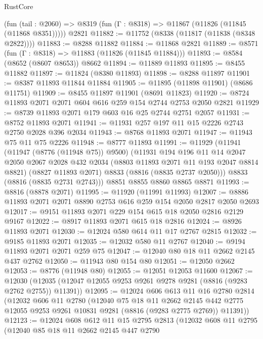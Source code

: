 \begin{lexlean}{RustCore}
\begin{coremodule}
    (fun (tail : @2060) => @8319 (fun (Γ : @8318) => @11867 (@11826 (@11845 (@11868 @8351)))))
    @2821
@11882 := @11752 (@8338 (@11817 (@11838 (@8348 @2822))))
@11883 := @8288 @11882
@11884 := @11868 @2821
@11889 := @8571 (fun (Γ : @8318) => @11883 (@11826 (@11845 @11884)))
@11893 := @8584 (@8652 (@8607 @8653)) @8662
@11894 := @11889 @11893
@11895 := @8455 @11882
@11897 := @11824 (@8380 @11893)
@11898 := @8288 @11897
@11901 := @8387 @11893 @11844 @11884
@11905 := @11895 (@11898 @11901) (@8686 @11751)
@11909 := @8455 @11897 @11901 (@8691 @11823)
@11920 := @8724 @11893 @2071 @2071 @604 @616 @259 @154 @2744 @2753 @2050 @2821
@11929 := @8739 @11893 @2071 @179 @603 @16 @25 @2744 @2751 @2057
@11931 := @8752 @11893 @2071
@11941 := @11931 @257 @197 @11 @15 @2226 @2743 @2750 @2028 @396 @2034
@11943 := @8768 @11893 @2071
@11947 := @11943 @75 @11 @75 @2226
@11948 := @8777 @11893
@11991 := @11929
    (@11941
      (@11947 (@8776 (@11948 @75)) @9500)
      (@11931
        @194
        @196
        @11
        @14
        @2047
        @2050
        @2067
        @2028
        @432
        @2034
        (@8803 @11893 @2071 @11 @193 @2047 @8814 @8821)
        (@8827 @11893 @2071)
        @8833
        (@8816 (@8835 @2737 @2050)))
      @8833
      (@8816 (@8835 @2731 @2743)))
    @8851
    @8855
    @8860
    @8865
    @8871
@11993 := @8816 (@8878 @2071)
@11995 := @11920 (@11991 @11993)
@12007 := @8886 @11893 @2071 @2071 @8890 @2753 @616 @259 @154 @2050 @2817 @2050 @2693
@12017 := @9151 @11893 @2071 @229 @154 @615 @18 @2050 @2816 @2129 @9167
@12022 := @8917 @11893 @2071 @615 @18 @2816
@12024 := @8926 @11893 @2071
@12030 := @12024 @580 @614 @11 @17 @2767 @2815
@12032 := @9185 @11893 @2071
@12035 := @12032 @580 @11 @2767
@12040 := @9194 @11893 @2071 @2071 @259 @75
@12047 := @12040 @80 @18 @11 @2662 @2145 @437 @2762
@12050 := @11943 @80 @154 @80
@12051 := @12050 @2662
@12053 := @8776 (@11948 @80)
@12055 := @12051 @12053 @11600
@12067 := @12030 (@12035 (@12047 @12055 @9253 @9261 @9278 @9281 (@8816 (@9283 @2762 @2755)) @11391))
@12095 := @12024
    @606
    @613
    @11
    @16
    @2780
    @2814
    (@12032
      @606
      @11
      @2780
      (@12040
        @75
        @18
        @11
        @2662
        @2145
        @442
        @2775
        @12055
        @9253
        @9261
        @10831
        @9281
        (@8816 (@9283 @2775 @2769))
        @11391))
@12123 := @12024
    @608
    @612
    @11
    @15
    @2795
    @2813
    (@12032
      @608
      @11
      @2795
      (@12040
        @85
        @18
        @11
        @2662
        @2145
        @447
        @2790

\end{coremodule}
\end{lexlean}
